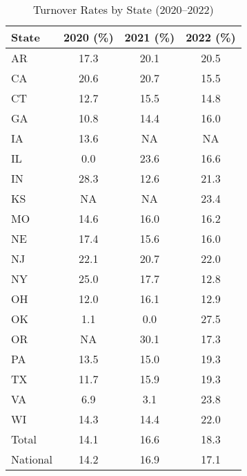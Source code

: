 \begin{table}[h!]
\centering
\begin{tabular}{lccc}
\toprule
State & 2020 (\%) & 2021 (\%) & 2022 (\%) \\
\midrule
AR & 17.3 & 20.1 & 20.5 \\
CA & 20.6 & 20.7 & 15.5 \\
CT & 12.7 & 15.5 & 14.8 \\
GA & 10.8 & 14.4 & 16.0 \\
IA & 13.6 & NA & NA \\
IL & 0.0 & 23.6 & 16.6 \\
IN & 28.3 & 12.6 & 21.3 \\
KS & NA & NA & 23.4 \\
MO & 14.6 & 16.0 & 16.2 \\
NE & 17.4 & 15.6 & 16.0 \\
NJ & 22.1 & 20.7 & 22.0 \\
NY & 25.0 & 17.7 & 12.8 \\
OH & 12.0 & 16.1 & 12.9 \\
OK & 1.1 & 0.0 & 27.5 \\
OR & NA & 30.1 & 17.3 \\
PA & 13.5 & 15.0 & 19.3 \\
TX & 11.7 & 15.9 & 19.3 \\
VA & 6.9 & 3.1 & 23.8 \\
WI & 14.3 & 14.4 & 22.0 \\
\midrule
Total & 14.1 & 16.6 & 18.3 \\
National & 14.2 & 16.9 & 17.1 \\
\bottomrule
\end{tabular}
\caption{Turnover Rates by State (2020--2022)}
\label{tab:turnover_rates}
\end{table}
